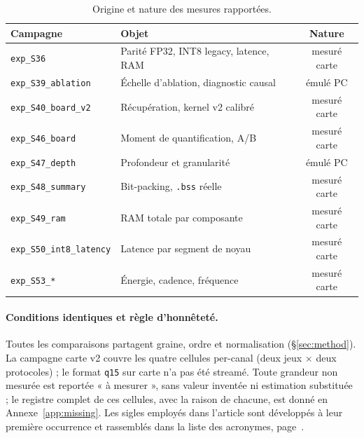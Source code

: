 \begin{table}[t]
\centering
\caption{Origine et nature des mesures rapportées.}
\label{tab:sources}
\begin{tabular}{llc}
\toprule
Campagne & Objet & Nature \\
\midrule
\texttt{exp\_S36}            & Parité FP32, INT8 legacy, latence, RAM & mesuré carte \\
\texttt{exp\_S39\_ablation}  & Échelle d'ablation, diagnostic causal   & émulé PC \\
\texttt{exp\_S40\_board\_v2} & Récupération, kernel v2 calibré         & mesuré carte \\
\texttt{exp\_S46\_board}     & Moment de quantification, A/B           & mesuré carte \\
\texttt{exp\_S47\_depth}     & Profondeur et granularité               & émulé PC \\
\texttt{exp\_S48\_summary}   & Bit-packing, \texttt{.bss} réelle       & mesuré carte \\
\texttt{exp\_S49\_ram}       & RAM totale par composante               & mesuré carte \\
\texttt{exp\_S50\_int8\_latency} & Latence par segment de noyau        & mesuré carte \\
\texttt{exp\_S53\_*}         & Énergie, cadence, fréquence             & mesuré carte \\
\bottomrule
\end{tabular}
\end{table}

\paragraph{Conditions identiques et règle d'honnêteté.} Toutes les comparaisons partagent graine, ordre et
normalisation (\S\ref{sec:method}). La campagne carte v2 couvre les quatre cellules per-canal (deux jeux
$\times$ deux protocoles) ; le format \texttt{q15} sur carte n'a pas été streamé. Toute grandeur non
mesurée est reportée « à mesurer », sans valeur inventée ni estimation substituée ; le registre
complet de ces cellules, avec la raison de chacune, est donné en Annexe~\ref{app:missing}.
Les sigles employés dans l'article sont développés à leur première occurrence et rassemblés dans la
liste des acronymes, page~\pageref{sec:acronyms}.
